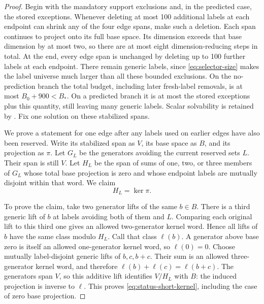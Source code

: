 \begin{proof}
Begin with the mandatory support exclusions and, in the predicted
case, the stored exceptions. Whenever deleting at most 100 additional
labels at each endpoint can shrink any of the four edge spans, make
such a deletion. Each span continues to project onto its full base
space. Its dimension exceeds that base dimension by at most two, so
there are at most eight dimension-reducing steps in total. At the end,
every edge span is unchanged by deleting up to 100 further labels at
each endpoint. There remain generic labels, since
\eqref{eq:selector-size} makes the label universe much larger than all
these bounded exclusions. On the no-prediction branch the total budget,
including later fresh-label removals, is at most $B_0+900<B_*$.
On a predicted branch it is at most the stored exceptions plus this
quantity, still leaving many generic labels. Scalar solvability is
retained by . Fix one solution on these stabilized
spans.

We prove a statement for one edge after any labels used on earlier
edges have also been reserved. Write its stabilized span as $V$, its
base space as $B$, and its projection as $\pi$. Let $G_L$ be the
generators avoiding the current reserved sets $L$. Their span is still
$V$. Let $H_L$ be the span of sums of one, two, or three members of
$G_L$ whose total base projection is zero and whose endpoint labels
are mutually disjoint within that word. We claim
\begin{equation}
\label{eq:status-short-kernel}
H_L=\ker\pi.
\end{equation}

To prove the claim, take two generator lifts of the same $b\in B$.
There is a third generic lift of $b$ at labels avoiding both of them
and $L$. Comparing each original lift to this third one gives an
allowed two-generator kernel word. Hence all lifts of $b$ have the
same class modulo $H_L$. Call that class $\ell(b)$. A generator
above base zero is itself an allowed one-generator kernel word, so
$\ell(0)=0$. Choose mutually label-disjoint generic lifts of
$b,c,b+c$. Their sum is an allowed three-generator kernel word,
and therefore $\ell(b)+\ell(c)=\ell(b+c)$. The generators span $V$,
so this additive lift identifies $V/H_L$ with $B$: the induced
projection is inverse to $\ell$. This proves
\eqref{eq:status-short-kernel}, including the case of zero base
projection.


\end{proof}
